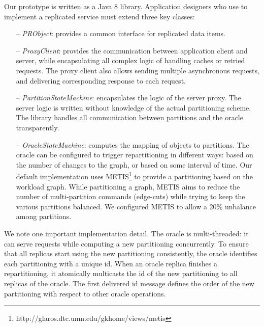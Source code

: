 Our  \dynastar prototype is written as a
Java 8 library.
Application designers who use \dynastar
 to implement a replicated service must extend three key classes:
 \begin{itemize}
 \item[--] \emph{PRObject}: provides a common interface for replicated data items.
 \item[--] \emph{ProxyClient}: provides the communication between application client and server, while encapsulating all 
 complex logic of handling caches or retried requests. The proxy client also allows sending multiple asynchronous requests, and delivering corresponding response to each request.
 \item[--] \emph{PartitionStateMachine}: encapsulates the logic of the server
   proxy. The server logic is written without knowledge of the actual partitioning scheme. The \dynastar library
   handles all communication between partitions and the oracle transparently.
 \item[--] \emph{OracleStateMachine}: computes the mapping of objects to partitions.
The oracle can be configured to trigger repartitioning in different ways: based on the number of changes to the graph, or based on some interval of time.
Our default implementation uses METIS\footnote{http://glaros.dtc.umn.edu/gkhome/views/metis} to provide a partitioning based on the workload graph.
While partitioning a graph, METIS aims to reduce the number of multi-partition commands (edge-cuts) while trying to keep the various partitions balanced. 
We configured METIS to allow a 20\% unbalance among partitions. 
 \end{itemize}

 We note one important implementation detail.  The oracle is
 multi-threaded: it can serve requests while computing a new
 partitioning concurrently. To ensure that all replicas start using
 the new partitioning consistently, the oracle identifies each
 partitioning with a unique id.  When an oracle replica finishes a
 repartitioning, it atomically multicasts the id of the new
 partitioning to all replicas of the oracle.  The first delivered id
 message defines the order of the new partitioning with respect to
 other oracle operations.

